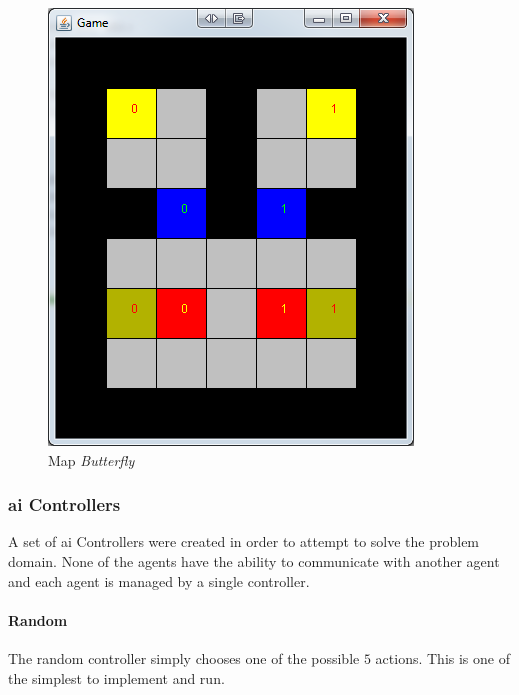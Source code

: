 \documentclass{IEEEtran}
\begin{document}
\begin{figure}[!t]
\centering
\includegraphics[scale=0.35]{level6}
\caption{Map \textit{Butterfly}}
\label{Butterfly}
\end{figure}


\subsubsection{\gls{ai} Controllers}
A set of \gls{ai} Controllers were created in order to attempt to solve the problem domain. None of the agents have the ability to communicate with another agent and each agent is managed by a single controller.

\paragraph{Random}
The random controller simply chooses one of the possible $5$ actions. This is one of the simplest to implement and run.

\end{document}
